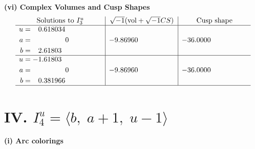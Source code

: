 \documentclass[1p]{elsarticle_modified}
\theoremstyle{definition}
\newcommand{\I}{\sqrt{-1}}
\begin{document}
\newpage\flushleft \textbf{(vi) Complex Volumes and Cusp Shapes}
$$\begin{array}{c|c|c}  
\text{Solutions to }I^u_{3}& \I (\text{vol} + \sqrt{-1}CS) & \text{Cusp shape}\\
 \hline 
\begin{aligned}
u &= \phantom{-}0.618034\phantom{ +0.000000I} \\
a &= \phantom{-0.000000 } 0 \\
b &= \phantom{-}2.61803\phantom{ +0.000000I}\end{aligned}
 & -9.86960\phantom{ +0.000000I} & -36.0000\phantom{ +0.000000I} \\ \hline\begin{aligned}
u &= -1.61803\phantom{ +0.000000I} \\
a &= \phantom{-0.000000 } 0 \\
b &= \phantom{-}0.381966\phantom{ +0.000000I}\end{aligned}
 & -9.86960\phantom{ +0.000000I} & -36.0000\phantom{ +0.000000I}\\
 \hline 
 \end{array}$$\newpage\newpage\renewcommand{\arraystretch}{1}
\centering \section*{IV. $I^u_{4}= \langle b,\;a+1,\;u-1 \rangle$}
\flushleft \textbf{(i) Arc colorings}\\
\end{document}
